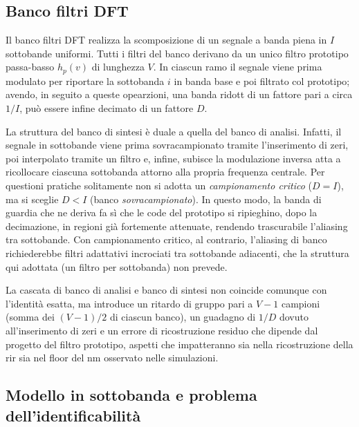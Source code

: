 \documentclass[11pt,a4paper]{article}
\begin{document}
	\subsection{Banco filtri DFT}\label{ssec:dft_bank}
	Il banco filtri DFT realizza la scomposizione di un segnale a banda piena in $I$ sottobande uniformi.
	Tutti i filtri del banco derivano da un unico filtro prototipo passa-basso $h_p(v)$ di lunghezza $V$.
	In ciascun ramo il segnale viene prima modulato per riportare la sottobanda $i$ in banda base e poi filtrato col prototipo; avendo, in seguito a queste opearzioni, una banda ridott di un fattore pari a circa $1/I$, può essere infine decimato di un fattore $D$.
	
	La struttura del banco di sintesi è duale a quella del banco di analisi. Infatti, il segnale in sottobande viene prima sovracampionato tramite l'inserimento di zeri, poi interpolato tramite un filtro e, infine, subisce la modulazione inversa atta a ricollocare ciascuna sottobanda attorno alla propria frequenza centrale.
	Per questioni pratiche solitamente non si adotta un \emph{campionamento critico} ($D=I$), ma si sceglie $D<I$ (banco \emph{sovracampionato}). In questo modo, la banda di guardia che ne deriva fa sì che le code del prototipo si ripieghino, dopo la decimazione, in regioni già fortemente attenuate, rendendo trascurabile l'aliasing tra sottobande. Con campionamento critico, al contrario, l'aliasing di banco richiederebbe filtri adattativi incrociati tra sottobande adiacenti, che la struttura qui adottata (un filtro per sottobanda) non prevede.
	
	La cascata di banco di analisi e banco di sintesi non coincide comunque con l'identità esatta, ma introduce un ritardo di gruppo pari a $V-1$ campioni (somma dei $(V-1)/2$ di ciascun banco), un guadagno di $1/D$ dovuto all'inserimento di zeri e un errore di ricostruzione residuo che dipende dal progetto del filtro prototipo, aspetti che impatteranno sia nella ricostruzione della \ac{rir} sia nel floor del \ac{nm} osservato nelle simulazioni.
	
	\subsection{Modello in sottobanda e problema dell'identificabilità}\label{ssec:model_ident}
	
\end{document}
